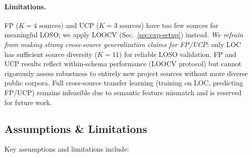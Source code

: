 \documentclass{ieeeaccess}
\begin{document}
\paragraph{Limitations.}
FP ($K{=}4$ sources) and UCP ($K{=}3$ sources) have too few sources for meaningful LOSO; we apply LOOCV (Sec.~\ref{sec:exp-setup}) instead. \textit{We refrain from making strong cross-source generalization claims for FP/UCP}: only LOC has sufficient source diversity ($K{=}11$) for reliable LOSO validation. FP and UCP results reflect within-schema performance (LOOCV protocol) but cannot rigorously assess robustness to entirely new project sources without more diverse public corpora. Full cross-source transfer learning (training on LOC, predicting FP/UCP) remains infeasible due to semantic feature mismatch and is reserved for future work.


\subsection{Assumptions \& Limitations}
\label{sec:assumptions}

Key assumptions and limitations include:
\end{document}

